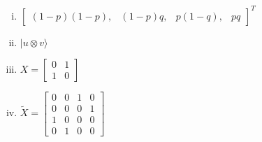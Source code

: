 \documentclass[11pt]{article}
\newenvironment{solution}{\begin{mdframed}[skipabove=\baselineskip,innertopmargin=\baselineskip,innerbottommargin=\baselineskip]
  }{\end{mdframed}}
\begin{document}
\begin{solution}
\begin{enumerate}[(i)]
    \item $\begin{bmatrix}(1-p)(1-p),&(1-p)q,&p(1-q),&pq\end{bmatrix}^T$
    
    \item $|u\otimes v\rangle$
    
    \item $X = \begin{bmatrix}0&1\\1&0\end{bmatrix}$
    
    \item $\tilde{X} = \begin{bmatrix}
    0&0&1&0\\0&0&0&1\\1&0&0&0\\0&1&0&0
    \end{bmatrix}$
\end{enumerate}
\end{solution}


 
 
 
\end{document}
